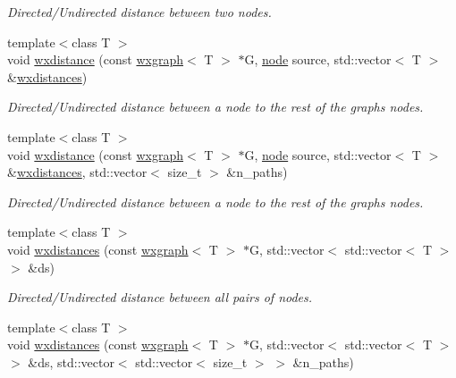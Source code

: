 \begin{DoxyCompactItemize}
\begin{DoxyCompactList}\small\item\em Directed/\+Undirected distance between two nodes. \end{DoxyCompactList}\item 
{\footnotesize template$<$class T $>$ }\\void \hyperlink{namespacelgraph_1_1traversal_ab270bbab26397a7a496d1afcf41e691e}{wxdistance} (const \hyperlink{classlgraph_1_1wxgraph}{wxgraph}$<$ T $>$ $\ast$G, \hyperlink{namespacelgraph_a397169dd66adf725210a30fb7251773e}{node} source, std\+::vector$<$ T $>$ \&\hyperlink{namespacelgraph_1_1traversal_ad93901449fffd98907c33422d5f92fda}{wxdistances})
\begin{DoxyCompactList}\small\item\em Directed/\+Undirected distance between a node to the rest of the graph\textquotesingle{}s nodes. \end{DoxyCompactList}\item 
{\footnotesize template$<$class T $>$ }\\void \hyperlink{namespacelgraph_1_1traversal_acf69657edd299c3e49285f631593fc96}{wxdistance} (const \hyperlink{classlgraph_1_1wxgraph}{wxgraph}$<$ T $>$ $\ast$G, \hyperlink{namespacelgraph_a397169dd66adf725210a30fb7251773e}{node} source, std\+::vector$<$ T $>$ \&\hyperlink{namespacelgraph_1_1traversal_ad93901449fffd98907c33422d5f92fda}{wxdistances}, std\+::vector$<$ size\+\_\+t $>$ \&n\+\_\+paths)
\begin{DoxyCompactList}\small\item\em Directed/\+Undirected distance between a node to the rest of the graph\textquotesingle{}s nodes. \end{DoxyCompactList}\item 
{\footnotesize template$<$class T $>$ }\\void \hyperlink{namespacelgraph_1_1traversal_ad93901449fffd98907c33422d5f92fda}{wxdistances} (const \hyperlink{classlgraph_1_1wxgraph}{wxgraph}$<$ T $>$ $\ast$G, std\+::vector$<$ std\+::vector$<$ T $>$ $>$ \&ds)
\begin{DoxyCompactList}\small\item\em Directed/\+Undirected distance between all pairs of nodes. \end{DoxyCompactList}\item 
{\footnotesize template$<$class T $>$ }\\void \hyperlink{namespacelgraph_1_1traversal_af883f4e22b53a8ebad2710acf88ae0d3}{wxdistances} (const \hyperlink{classlgraph_1_1wxgraph}{wxgraph}$<$ T $>$ $\ast$G, std\+::vector$<$ std\+::vector$<$ T $>$ $>$ \&ds, std\+::vector$<$ std\+::vector$<$ size\+\_\+t $>$ $>$ \&n\+\_\+paths)

\end{DoxyCompactItemize}

